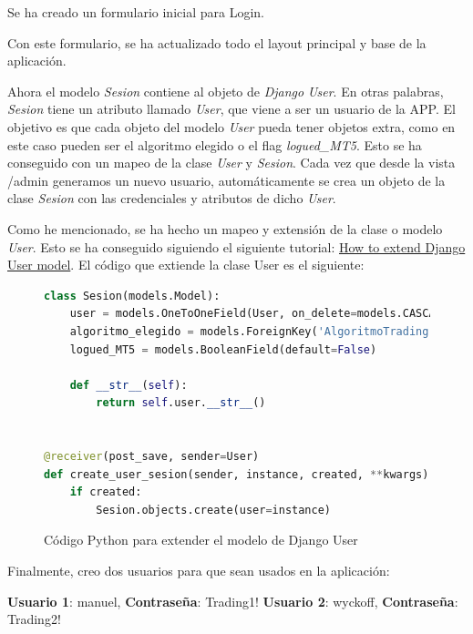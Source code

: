 Se ha creado un formulario inicial para Login. \newline

Con este formulario, se ha actualizado todo el layout principal y base de la aplicación.\newline

Ahora el modelo \textit{Sesion} contiene al objeto de \textit{Django} \textit{User}. En otras palabras, \textit{Sesion} tiene un atributo llamado \textit{User}, que viene a ser un usuario de la APP. El objetivo es que cada objeto del modelo \textit{User} pueda tener objetos extra, como en este caso pueden ser el algoritmo elegido o el flag \textit{logued\_MT5}. Esto se ha conseguido con un mapeo de la clase \textit{User} y \textit{Sesion}. Cada vez que desde la vista /admin generamos un nuevo usuario, automáticamente se crea un objeto de la clase \textit{Sesion} con las credenciales y atributos de dicho \textit{User}. \newline

Como he mencionado, se ha hecho un mapeo y extensión de la clase o modelo \textit{User}. Esto se ha conseguido siguiendo el siguiente tutorial: \href{https://simpleisbetterthancomplex.com/tutorial/2016/07/22/how-to-extend-django-user-model.html}{How to extend Django User model}. El código que extiende la clase User es el siguiente:\newline

\begin{figure}[h]
	\begin{lstlisting}[language=Python]
class Sesion(models.Model):
	user = models.OneToOneField(User, on_delete=models.CASCADE, null=True)
	algoritmo_elegido = models.ForeignKey('AlgoritmoTrading', on_delete=models.SET_NULL, null=True)
	logued_MT5 = models.BooleanField(default=False)

	def __str__(self):
		return self.user.__str__()


@receiver(post_save, sender=User)
def create_user_sesion(sender, instance, created, **kwargs):
	if created:
		Sesion.objects.create(user=instance)
	\end{lstlisting}
	\caption{Código Python para extender el modelo de Django User}
\end{figure}

Finalmente, creo dos usuarios para que sean usados en la aplicación:\newline

\textbf{Usuario 1}: manuel, \textbf{Contraseña}: Trading1!\newline
\textbf{Usuario 2}: wyckoff, \textbf{Contraseña}: Trading2!

